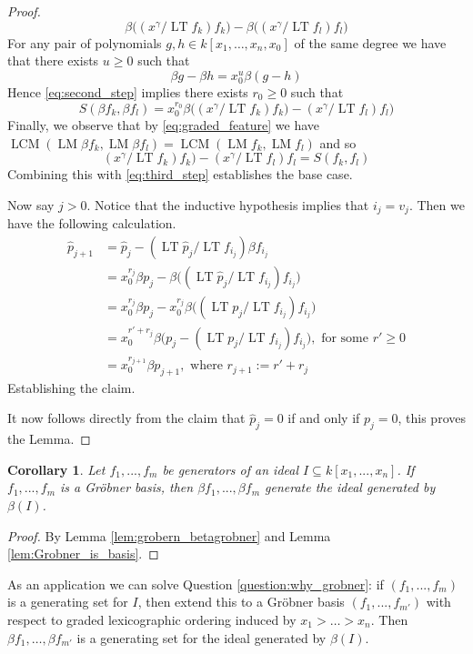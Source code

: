 \documentclass[12pt]{article}
\theoremstyle{plain}
\newtheorem{cor}[thm]{Corollary}
\theoremstyle{definition}
\begin{document}
\begin{proof}
\begin{equation}
		\beta\big((x^\gamma / \operatorname{LT}f_k)f_k\big) - \beta\big((x^\gamma/\operatorname{LT}f_l) f_l\big)
		\end{equation}
	For any pair of polynomials $g,h \in k[x_1,\hdots, x_n, x_0]$ of the same degree we have that there exists $u \geq 0$ such that
	\begin{equation}
		\beta g - \beta h = x_0^u \beta(g - h)
		\end{equation}
	Hence \eqref{eq:second_step} implies there exists $r_0 \geq 0$ such that
	\begin{equation}\label{eq:third_step}
		S(\beta f_k, \beta f_l) = x_0^{r_0}\beta\big((x^\gamma/\operatorname{LT}f_k)f_k) - (x^\gamma/\operatorname{LT}f_l)f_l\big)
		\end{equation}
	Finally, we observe that by \eqref{eq:graded_feature} we have $\operatorname{LCM}(\operatorname{LM}\beta f_k, \operatorname{LM}\beta f_l) = \operatorname{LCM}(\operatorname{LM} f_k, \operatorname{LM} f_l)$ and so
	\begin{equation}
		(x^\gamma/\operatorname{LT}f_k)f_k) - (x^\gamma/\operatorname{LT}f_l)f_l = S(f_k, f_l)
		\end{equation}
	Combining this with \eqref{eq:third_step} establishes the base case.
	
	Now say $j > 0$. Notice that the inductive hypothesis implies that $i_j = v_j$. Then we have the following calculation.
	\begin{align}
		\hat{p}_{j+1} &= \hat{p}_j - (\operatorname{LT}\hat{p}_j/\operatorname{LT}f_{i_j})\beta f_{i_j}\\
		&= x_0^{r_j}\beta p_j - \beta\big((\operatorname{LT}\hat{p}_j/\operatorname{LT}f_{i_j}) f_{i_j}\big)\\
		&= x_0^{r_j}\beta p_j - x_0^{r_j}\beta\big((\operatorname{LT}p_j/\operatorname{LT}f_{i_j}) f_{i_j}\big)\\
		&= x_0^{r' + r_j}\beta\big(p_j - (\operatorname{LT}p_j/\operatorname{LT}f_{i_j})f_{i_j}\big),\text{ for some }r'\geq 0\\
		&= x_0^{r_{j+1}}\beta p_{j+1},\text{ where }r_{j + 1} := r' + r_j
		\end{align}
	Establishing the claim.
	
	It now follows directly from the claim that $\hat{p}_j = 0$ if and only if $p_j = 0$, this proves the Lemma.
\end{proof}
\begin{cor}\label{cor:relate_beta_grobner}
Let $f_1,...,f_m$ be generators of an ideal $I \subseteq k[x_1,...,x_n]$. If $f_1,...,f_m$ is a Gr\"{o}bner basis, then $\beta f_1,...,\beta f_m$ generate the ideal generated by $\beta(I)$.
\end{cor}
\begin{proof}
By Lemma \ref{lem:grobern_betagrobner} and Lemma \ref{lem:Grobner_is_basis}.
\end{proof}
As an application we can solve Question \ref{question:why_grobner}: if $(f_1,...,f_m)$ is a generating set for $I$, then extend this to a Gr\"{o}bner basis $(f_1,...,f_{m'})$ with respect to graded lexicographic ordering induced by $x_1 > \hdots > x_n$. Then $\beta f_1, \hdots, \beta f_{m'}$ is a generating set for the ideal generated by $\beta(I)$.
\end{document}

